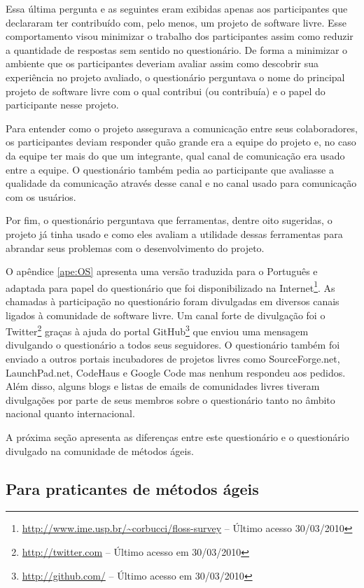 Essa última pergunta e as seguintes eram exibidas apenas aos
participantes que declararam ter contribuído com, pelo menos, um
projeto de software livre. Esse comportamento visou minimizar o
trabalho dos participantes assim como reduzir a quantidade de
respostas sem sentido no questionário. De forma a minimizar o ambiente
que os participantes deveriam avaliar assim como descobrir sua
experiência no projeto avaliado, o questionário perguntava o nome do
principal projeto de software livre com o qual contribui (ou
contribuía) e o papel do participante nesse projeto.

Para entender como o projeto assegurava a comunicação entre seus
colaboradores, os participantes deviam responder quão grande era a
equipe do projeto e, no caso da equipe ter mais do que um integrante,
qual canal de comunicação era usado entre a equipe. O questionário
também pedia ao participante que avaliasse a qualidade da comunicação
através desse canal e no canal usado para comunicação com os usuários.

Por fim, o questionário perguntava que ferramentas, dentre oito
sugeridas, o projeto já tinha usado e como eles avaliam a utilidade
dessas ferramentas para abrandar seus problemas com o desenvolvimento
do projeto.

O apêndice \ref{ape:OS} apresenta uma versão traduzida para o
Português e adaptada para papel do questionário que foi
disponibilizado na
Internet\footnote{\url{http://www.ime.usp.br/~corbucci/floss-survey} --
  Último acesso 30/03/2010}. As chamadas à participação no
questionário foram divulgadas em diversos canais ligados à comunidade
de software livre. Um canal forte de divulgação foi o
Twitter\footnote{\url{http://twitter.com} -- Último acesso em 30/03/2010}
graças à ajuda do portal GitHub\footnote{\url{http://github.com/} -- Último
  acesso em 30/03/2010} que enviou uma mensagem divulgando o
questionário a todos seus seguidores. O questionário também foi
enviado a outros portais incubadores de projetos livres como
SourceForge.net, LaunchPad.net, CodeHaus e Google Code mas nenhum
respondeu aos pedidos. Além disso, alguns blogs e listas de emails de
comunidades livres tiveram divulgações por parte de seus membros sobre
o questionário tanto no âmbito nacional quanto internacional.

A próxima seção apresenta as diferenças entre este questionário e o
questionário divulgado na comunidade de métodos ágeis.

\subsection{Para praticantes de métodos ágeis}
\label{subsec:agile}

